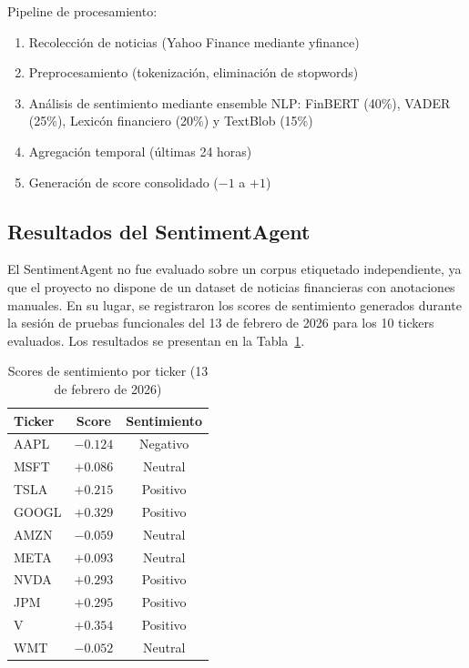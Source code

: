   Pipeline de procesamiento:
  
  \begin{enumerate}
      \item Recolección de noticias (Yahoo Finance mediante yfinance)
      \item Preprocesamiento (tokenización, eliminación de stopwords)
      \item Análisis de sentimiento mediante ensemble NLP: FinBERT (40\%), VADER (25\%),      
  Lexicón financiero (20\%) y TextBlob (15\%)
      \item Agregación temporal (últimas 24 horas)
      \item Generación de score consolidado ($-1$ a $+1$)
  \end{enumerate}
  
\subsection{Resultados del SentimentAgent}

  El SentimentAgent no fue evaluado sobre un corpus etiquetado independiente, ya que el       
  proyecto no dispone de un dataset de noticias financieras con anotaciones manuales. En su   
  lugar, se registraron los scores de sentimiento generados durante la sesión de pruebas      
  funcionales del 13 de febrero de 2026 para los 10 tickers evaluados. Los resultados se      
  presentan en la Tabla~\ref{tab:sentiment-resultados}.

  \begin{table}[H]
  \centering
  \caption{Scores de sentimiento por ticker (13 de febrero de 2026)}
  \label{tab:sentiment-resultados}
  \begin{tabular}{lcc}
  \toprule
  \textbf{Ticker} & \textbf{Score} & \textbf{Sentimiento} \\
  \midrule
  AAPL  & $-0.124$ & Negativo \\
  MSFT  & $+0.086$ & Neutral  \\
  TSLA  & $+0.215$ & Positivo \\
  GOOGL & $+0.329$ & Positivo \\
  AMZN  & $-0.059$ & Neutral  \\
  META  & $+0.093$ & Neutral  \\
  NVDA  & $+0.293$ & Positivo \\
  JPM   & $+0.295$ & Positivo \\
  V     & $+0.354$ & Positivo \\
  WMT   & $-0.052$ & Neutral  \\
  \bottomrule
  \end{tabular}
  \end{table}

